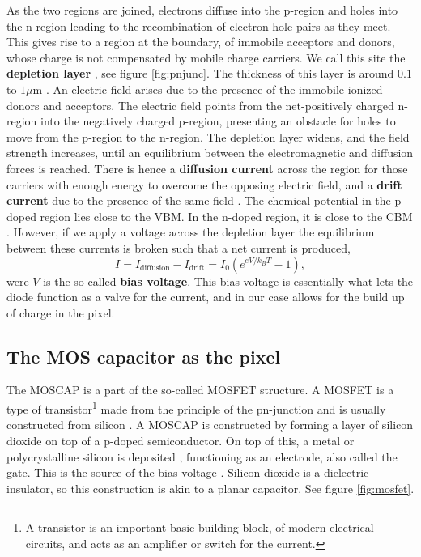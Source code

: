 \documentclass[../main.tex]{subfiles}
\begin{document}
	As the two regions are joined, electrons diffuse into the p-region and holes into the n-region leading to the recombination of electron-hole pairs as they meet. This gives rise to a region at the boundary, of immobile acceptors and donors, whose charge is not compensated by mobile charge carriers. We call this site the \textbf{depletion layer} \cite{solidstatephysicsbook}, see figure \ref{fig:pnjunc}. The thickness of this layer is around $0.1$ to $1 \mu$m \cite{solidstatephysicsbook}. An electric field arises due to the presence of the immobile ionized donors and acceptors. The electric field points from the net-positively charged n-region into the negatively charged p-region, presenting an obstacle for holes to move from the p-region to the n-region. The depletion layer widens, and the field strength increases, until an equilibrium between the electromagnetic and diffusion forces is reached. There is hence a \textbf{diffusion current} across the region for those carriers with enough energy to overcome the opposing electric field, and a \textbf{drift current} due to the presence of the same field \cite{solidstatephysicsbook}. The chemical potential in the p-doped region lies close to the VBM. In the n-doped region, it is close to the CBM \cite{solidstatephysicsbook} . However, if we apply a voltage across the depletion layer the equilibrium between these currents is broken such that a net current\cite{solidstatephysicsbook} is produced,
	\begin{equation}
		I = I_\text{diffusion} - I_\text{drift} = I_0\left(e^{eV/k_BT}-1\right),
	\end{equation}
	were $V$ is the so-called \textbf{bias voltage}. This bias voltage is essentially what lets the diode function as a valve for the current, and in our case allows for the build up of charge in the pixel.
	
	\subsection{The MOS capacitor as the pixel}
	The MOSCAP is a part of the so-called MOSFET structure. A MOSFET is a type of transistor\footnote{A transistor is an important basic building block, of modern electrical circuits, and acts as an amplifier or switch for the current.} made from the principle of the pn-junction and is usually constructed from silicon \cite{comphistmus}. A MOSCAP is constructed by forming a layer of silicon dioxide on top of a p-doped semiconductor. On top of this, a metal or polycrystalline silicon is deposited \cite{ccdwiki}, functioning as an electrode, also called the gate. This is the source of the bias voltage \cite{solidstatephysicsbook}. Silicon dioxide is a dielectric insulator, so this construction is akin to a planar capacitor. See figure \ref{fig:mosfet}.
	
\end{document}
